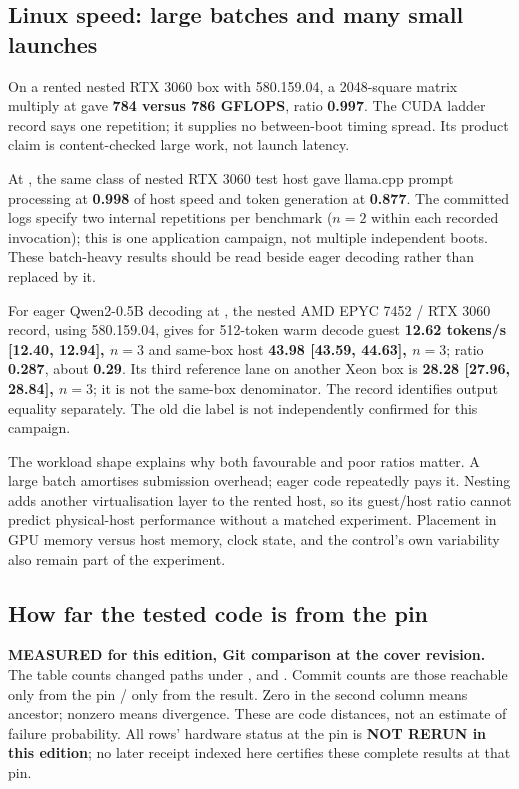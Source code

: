\subsection{Linux speed: large batches and many small launches}

\reported On a rented nested RTX 3060 box with 580.159.04, a 2048-square matrix multiply at
 gave \textbf{784 versus 786 GFLOPS}, ratio \textbf{0.997}. The CUDA ladder
record says one repetition; it supplies no between-boot timing spread. Its product claim is
content-checked large work, not launch latency.

\reported At , the same class of nested RTX 3060 test host gave llama.cpp
prompt processing at \textbf{0.998} of host speed and token generation at \textbf{0.877}.
The committed logs specify two internal repetitions per benchmark ($n=2$ within each
recorded invocation); this is one application campaign, not multiple independent boots.
These batch-heavy results should be read beside eager decoding rather than replaced by it.

\reported For eager Qwen2-0.5B decoding at , the nested AMD EPYC 7452 /
RTX 3060 record, using 580.159.04, gives for 512-token warm decode guest
\textbf{12.62 tokens/s [12.40, 12.94],
$n=3$} and same-box host \textbf{43.98 [43.59, 44.63], $n=3$}; ratio \textbf{0.287}, about
\textbf{0.29}. Its third reference lane on another Xeon box is \textbf{28.28 [27.96, 28.84],
$n=3$}; it is not the same-box denominator. The record identifies output equality separately.
The old die label is not independently confirmed for this campaign.

\inferred The workload shape explains why both favourable and poor ratios matter. A large
batch amortises submission overhead; eager code repeatedly pays it. Nesting adds another
virtualisation layer to the rented host, so its guest/host ratio cannot predict physical-host
performance without a matched experiment. Placement in GPU memory versus host memory, clock
state, and the control's own variability also remain part of the experiment.

\subsection{How far the tested code is from the pin}
\label{sec:distances}

\textbf{MEASURED for this edition, Git comparison at the cover revision.} The table counts
changed paths under ,  and . Commit counts are those
reachable only from the pin / only from the result. Zero in the second column means ancestor;
nonzero means divergence. These are code distances, not an estimate of failure probability.
All rows' hardware status at the pin is \textbf{NOT RERUN in this edition}; no later receipt
indexed here certifies these complete results at that pin.


